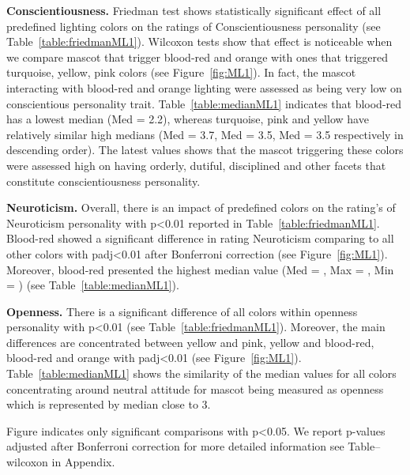 \par\textbf{Conscientiousness.}
Friedman test shows statistically significant effect of all predefined lighting colors
on the ratings of Conscientiousness personality (see Table~\ref{table:friedmanML1}).
Wilcoxon tests show that effect is noticeable when we compare mascot that trigger
blood-red and orange with ones that triggered turquoise, yellow, pink colors (see Figure~\ref{fig:ML1}).
In fact, the mascot interacting with blood-red and orange lighting were assessed
as being very low on conscientious personality trait.
Table~\ref{table:medianML1} indicates that blood-red has a lowest median (Med = 2.2), whereas turquoise, pink and
yellow have relatively similar high medians (Med = 3.7, Med = 3.5, Med = 3.5 respectively in descending order).
The latest values shows that the mascot triggering these colors were assessed high on having
orderly, dutiful, disciplined and other facets that constitute conscientiousness personality.

\par\textbf{Neuroticism.}
Overall, there is an impact of predefined colors on the rating's of Neuroticism
personality with p<0.01 reported in Table~\ref{table:friedmanML1}.
Blood-red showed a significant difference in rating Neuroticism comparing
to all other colors with padj<0.01 after Bonferroni correction (see Figure~\ref{fig:ML1}).
Moreover, blood-red presented the highest median value (Med = , Max = , Min = ) (see Table~\ref{table:medianML1}).

\par\textbf{Openness.}
There is a significant difference of all colors within openness personality
with p<0.01 (see Table~\ref{table:friedmanML1}).
Moreover, the main differences are concentrated between yellow and pink, yellow and blood-red,
blood-red and orange with padj<0.01 (see Figure~\ref{fig:ML1}).
Table~\ref{table:medianML1} shows the similarity of the median values for all colors concentrating around neutral attitude for mascot
being measured as openness which is represented by median close to 3.

Figure indicates only significant comparisons with p<0.05.
We report p-values adjusted after Bonferroni correction for more
detailed information see Table--wilcoxon in Appendix.

